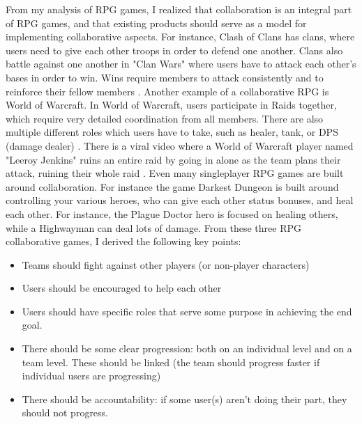 \documentclass{l4proj}
\begin{document}
From my analysis of RPG games, I realized that collaboration is an integral part of RPG games, and that existing products should serve as a model for implementing collaborative aspects. For instance, Clash of Clans has clans, where users need to give each other troops in order to defend one another. Clans also battle against one another in "Clan Wars" where users have to attack each other's bases in order to win. Wins require members to attack consistently and to reinforce their fellow members \citep{coc}. 
Another example of a collaborative RPG is World of Warcraft. In World of Warcraft, users participate in Raids together, which require very detailed coordination from all members. There are also multiple different roles which users have to take, such as healer, tank, or DPS (damage dealer) \citep{wow}. There is a viral video where a World of Warcraft player named "Leeroy Jenkins" ruins an entire raid by going in alone as the team plans their attack, ruining their whole raid \citep{leeroy_jenkins}. Even many singleplayer RPG games are built around collaboration. For instance the game Darkest Dungeon \citet{darkest_dungeon} is built around controlling your various heroes, who can give each other status bonuses, and heal each other. For instance, the Plague Doctor hero is focused on healing others, while a Highwayman can deal lots of damage. From these three RPG collaborative games, I derived the following key points:

\begin{itemize}    
    \item
      Teams should fight against other players (or non-player characters)
    \item
      Users should be encouraged to help each other
    \item
      Users should have specific roles that serve some purpose in achieving the end goal.
    \item 
      There should be some clear progression: both on an individual level and on a team level. These should be linked (the team should progress faster if individual users are progressing)
    \item 
      There should be accountability: if some user(s) aren't doing their part, they should not progress.
\end{itemize}


\end{document}
